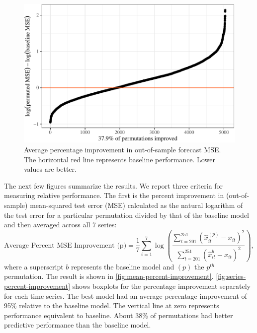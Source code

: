 \documentclass[11pt]{article}
\renewcommand{\hat}{\widehat}
\begin{document}
\begin{figure}[t]

{\centering \includegraphics{gfx/mean-percent-improvement-1} 

}

\caption{Average percentage improvement in out-of-sample forecast MSE. The horizontal red line represents baseline performance. Lower values are better.}\label{fig:mean-percent-improvement}
\end{figure}

The next few figures summarize the results. We report three criteria for
measuring relative performance. The first is the percent improvement in
(out-of-sample) mean-squared test error (MSE) calculated as the natural
logarithm of the test error for a particular permutation divided by that
of the baseline model and then averaged across all 7 series:
\begin{equation}
  \mbox{Average Percent MSE Improvement (p)} = \frac{1}{7} \sum_{i=1}^7 \log
  \left(\frac{\sum_{t=201}^{251} (\hat{x}_{it}^{(p)}-x_{it})^2}
    {\sum_{t=201}^{251} (\hat{x}_{it}^{b}-x_{it})^2}\right),
\end{equation} where a superscript \(b\) represents the baseline model
and \((p)\) the \(p^{th}\) permutation. The result is shown in
\autoref{fig:mean-percent-improvement}.
\autoref{fig:series-percent-improvement} shows boxplots for the
percentage improvement separately for each time series. The best model
had an average percentage improvement of 95\% relative to the baseline
model. The vertical line at zero represents performance equivalent to
baseline. About 38\% of permutations had better predictive performance
than the baseline model.
\end{document}
